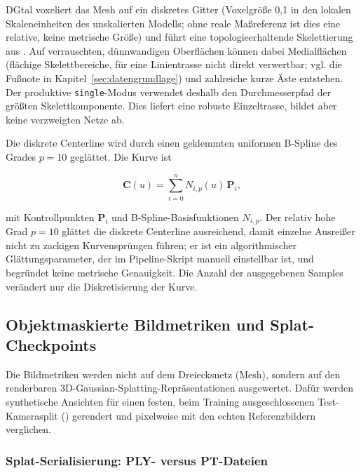 DGtal voxeliert das Mesh auf ein diskretes Gitter (Voxelgröße 0,1 in den
lokalen Skaleneinheiten des unskalierten Modells; ohne reale Maßreferenz ist
dies eine relative, keine metrische Größe) und führt eine
topologieerhaltende Skelettierung aus
\parencite{dgtalProject}. Auf verrauschten, dünnwandigen Oberflächen können
dabei Medialflächen (flächige Skelettbereiche, für eine Linientrasse nicht
direkt verwertbar; vgl. die Fußnote in Kapitel~\ref{sec:datengrundlage}) und
zahlreiche kurze Äste entstehen. Der produktive
\texttt{single}-Modus verwendet deshalb den Durchmesserpfad der größten
Skelettkomponente. Dies liefert eine robuste Einzeltrasse, bildet aber keine
verzweigten Netze ab.

Die diskrete Centerline wird durch einen geklemmten uniformen B-Spline des
Grades $p=10$ geglättet. Die Kurve ist

\begin{equation}
	\mathbf{C}(u)=\sum_{i=0}^{n}N_{i,p}(u)\,\mathbf{P}_i,
	\label{eq:bspline}
\end{equation}

mit Kontrollpunkten $\mathbf{P}_i$ und B-Spline-Basisfunktionen $N_{i,p}$.
Der relativ hohe Grad $p=10$ glättet die diskrete Centerline ausreichend,
damit einzelne Ausreißer nicht zu zackigen Kurvensprüngen führen; er ist ein
algorithmischer Glättungsparameter, der im Pipeline-Skript manuell einstellbar
ist, und begründet keine metrische Genauigkeit. Die Anzahl der ausgegebenen
Samples verändert nur die Diskretisierung der Kurve.

\subsection{Objektmaskierte Bildmetriken und Splat-Checkpoints}

Die Bildmetriken werden nicht auf dem Dreiecksnetz (Mesh), sondern auf den
renderbaren 3D-Gaussian-Splatting-Repräsentationen ausgewertet. Dafür werden
synthetische Ansichten für einen festen, beim Training ausgeschlossenen
Test-Kamerasplit () gerendert und pixelweise mit den
echten Referenzbildern verglichen.

\subsubsection*{Splat-Serialisierung: PLY- versus PT-Dateien}

